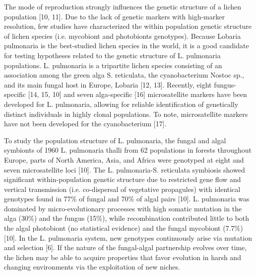 \documentclass[runningheads,a4paper]{llncs}
\begin{document}
The mode of reproduction strongly influences the genetic structure of a lichen population [10, 11]. Due to the lack of genetic markers with high-marker resolution, few studies have characterized the within population genetic structure of lichen species (i.e. mycobiont and photobionts genotypes). Because Lobaria pulmonaria is the best-studied lichen species in the world, it is a good candidate for testing hypotheses related to the genetic structure of L. pulmonaria  populations. L. pulmonaria is a tripartite lichen species consisting of an association among the green alga S. reticulata, the cyanobacterium Nostoc sp., and its main fungal host in Europe, Lobaria [12, 13]. Recently, eight fungus-specific [14, 15, 10] and seven alga-specific [16] microsatellite markers have been developed for L. pulmonaria, allowing for reliable identification of genetically distinct individuals in highly clonal populations. To note, microsatellite markers have not been developed for the cyanobacterium [17]. 

To study the population structure of L. pulmonaria, the fungal and algal symbionts of 1960 L. pulmonaria thalli from 62 populations in forests throughout Europe, parts of North America, Asia, and Africa were genotyped at eight and seven microsatellite loci [10]. The L. pulmonaria-S. reticulata symbiosis showed significant within-population genetic structure due to restricted gene flow and vertical transmission (i.e. co-dispersal of vegetative propagules) with identical genotypes found in 77\% of fungal and 70\% of algal pairs [10]. L. pulmonaria was dominated by micro-evolutionary processes with high somatic mutation in the alga (30\%) and the fungus (15\%), while recombination contributed little to both the algal photobiont (no statistical evidence) and the fungal mycobiont (7.7\%) [10]. In the L. pulmonaria system, new genotypes continuously arise via mutation and selection [6]. If the nature of the fungal-algal partnership evolves over time, the lichen may be able to acquire properties that favor evolution in harsh and changing environments via the exploitation of new niches.
\end{document}

